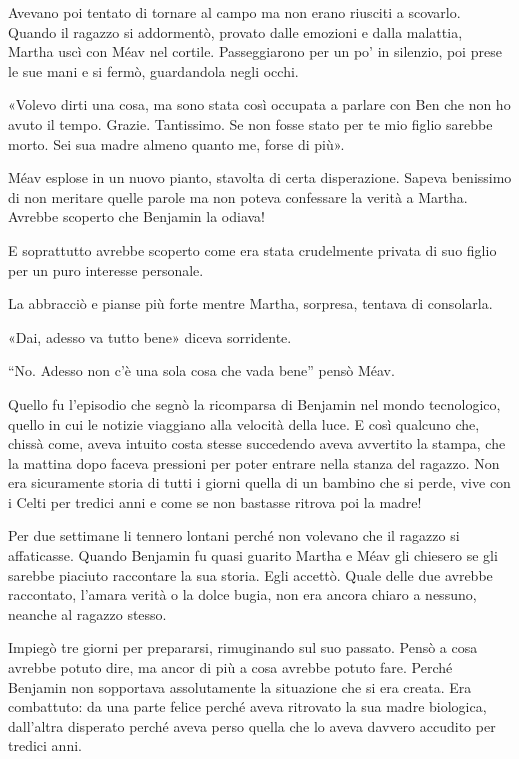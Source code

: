 \documentclass[a4paper,11pt,oneside,openright,final]{memoir}
\begin{document}
Avevano poi tentato di tornare al campo ma non erano riusciti a scovarlo. Quando
il ragazzo si addormentò, provato dalle emozioni e dalla malattia, Martha uscì
con Méav nel cortile. Passeggiarono per un po’ in silenzio, poi prese le sue
mani e si fermò, guardandola negli occhi.

«Volevo dirti una cosa, ma sono stata così occupata a parlare con Ben che non
ho avuto il tempo. Grazie. Tantissimo. Se non fosse stato per te mio figlio
sarebbe morto. Sei sua madre almeno quanto me, forse di più».

Méav esplose in un nuovo pianto, stavolta di certa disperazione. Sapeva
benissimo di non meritare quelle parole ma non poteva confessare la verità a
Martha. Avrebbe scoperto che Benjamin la odiava!

E soprattutto avrebbe scoperto come era stata crudelmente privata di suo figlio
per un puro interesse personale.

La abbracciò e pianse più forte mentre Martha, sorpresa, tentava di
consolarla.

«Dai, adesso va tutto bene» diceva sorridente.

``No. Adesso non c’è una sola cosa che vada bene'' pensò Méav.

Quello fu l’episodio che segnò la ricomparsa di Benjamin nel mondo
tecnologico, quello in cui le notizie viaggiano alla velocità della luce. E
così qualcuno che, chissà come, aveva intuito costa stesse succedendo aveva
avvertito la stampa, che la mattina dopo faceva pressioni per poter entrare
nella stanza del ragazzo. Non era sicuramente storia di tutti i giorni quella di
un bambino che si perde, vive con i Celti per tredici anni e come se non
bastasse ritrova poi la madre!

Per due settimane li tennero lontani perché non volevano che il ragazzo si
affaticasse. Quando Benjamin fu quasi guarito Martha e Méav gli chiesero se gli
sarebbe piaciuto raccontare la sua storia. Egli accettò. Quale delle due
avrebbe raccontato, l’amara verità o la dolce bugia, non era ancora chiaro a
nessuno, neanche al ragazzo stesso.

Impiegò tre giorni per prepararsi, rimuginando sul suo passato. Pensò a cosa
avrebbe potuto dire, ma ancor di più a cosa avrebbe potuto fare. Perché
Benjamin non sopportava assolutamente la situazione che si era creata. Era
combattuto: da una parte felice perché aveva ritrovato la sua madre biologica,
dall’altra disperato perché aveva perso quella che lo aveva davvero accudito
per tredici anni.
\end{document}
